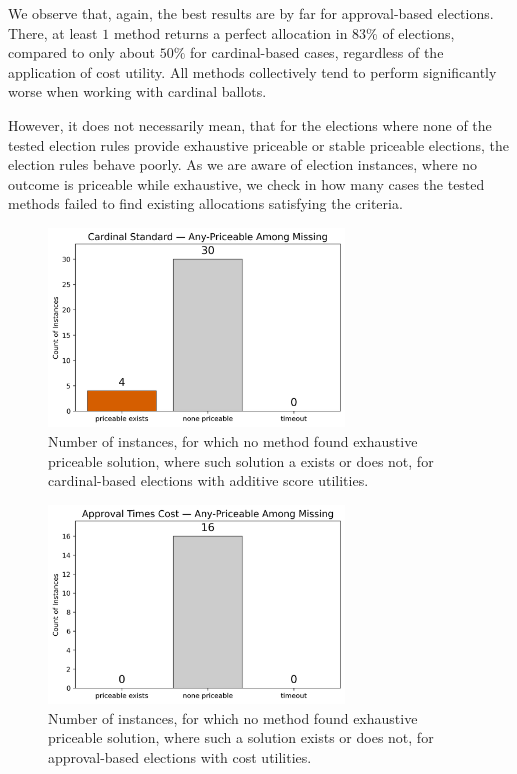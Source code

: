 We observe that, again, the best results are by far for approval-based elections. There, at least $1$ method returns a perfect allocation in $83\%$ of elections, compared to only about $50\%$ for cardinal-based cases, regardless of the application of cost utility. All methods collectively tend to perform significantly worse when working with cardinal ballots.

However, it does not necessarily mean, that for the elections where none of the tested election rules provide exhaustive priceable or stable priceable elections, the election rules behave poorly. As we are aware of election instances, where no outcome is priceable while exhaustive, we check in how many cases the tested methods failed to find existing allocations satisfying the criteria. 
\begin{figure}[H]         
  \centering              
  \includegraphics[width=0.7\textwidth]{figures/plots/cardinal-standard/cardinal_standard_any_priceable.png}
  \caption{Number of instances, for which no method found exhaustive priceable solution, where such solution a exists or does not, for cardinal-based elections with additive score utilities.}
  \label{fig:myplot}
\end{figure}
\begin{figure}[H]         
  \centering              
  \includegraphics[width=0.7\textwidth]{figures/plots/approval-times-cost/approval_times_cost_any_priceable.png}
  \caption{Number of instances, for which no method found exhaustive priceable solution, where such a solution exists or does not, for approval-based elections with cost utilities.}
  \label{fig:myplot}
\end{figure}
